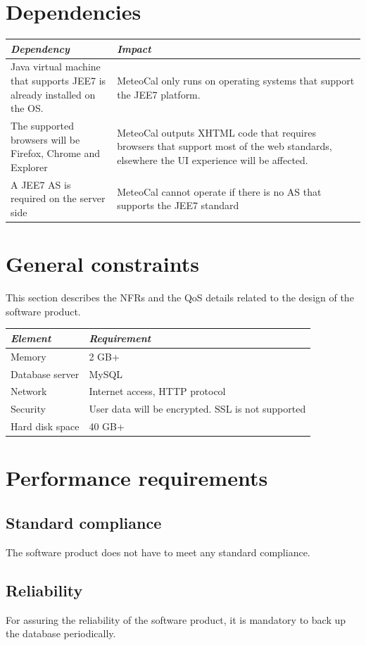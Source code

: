 \documentclass[10pt,a4paper,titlepage]{article}
\begin{document}
\section{Dependencies}
\begin{tabular}{| p{0.3\linewidth} | p{0.7\linewidth} |}
\hline	\emph{Dependency}	&	\emph{Impact}	\\
\hline	Java virtual machine that supports JEE7 is already installed on the OS. & MeteoCal only runs on operating systems that support the JEE7 platform.	\\
\hline	The supported browsers will be Firefox, Chrome and Explorer & MeteoCal outputs XHTML code that requires browsers that support most of the web standards, elsewhere the UI experience will be affected.	\\
\hline	A JEE7 AS is required on the server side	&	MeteoCal cannot operate if there is no AS that supports the JEE7 standard	\\
\hline
\end{tabular}

\section{General constraints}
This section describes the NFRs and the QoS details related to the design of the software product.

\noindent\begin{tabular}{| l | l |}
\hline	\emph{Element}	&	\emph{Requirement}	\\
\hline	Memory			&	2 GB+				\\
\hline	Database server	&	MySQL				\\
\hline	Network			&	Internet access, HTTP protocol	\\
\hline	Security		&	User data will be encrypted. SSL is not supported	\\
\hline	Hard disk space	&	40 GB+				\\
\hline
\end{tabular}

\section{Performance requirements}
\subsection{Standard compliance}
The software product does not have to meet any standard compliance.

\subsection{Reliability}
For assuring the reliability of the software product, it is mandatory to back up the database periodically.
\end{document}

